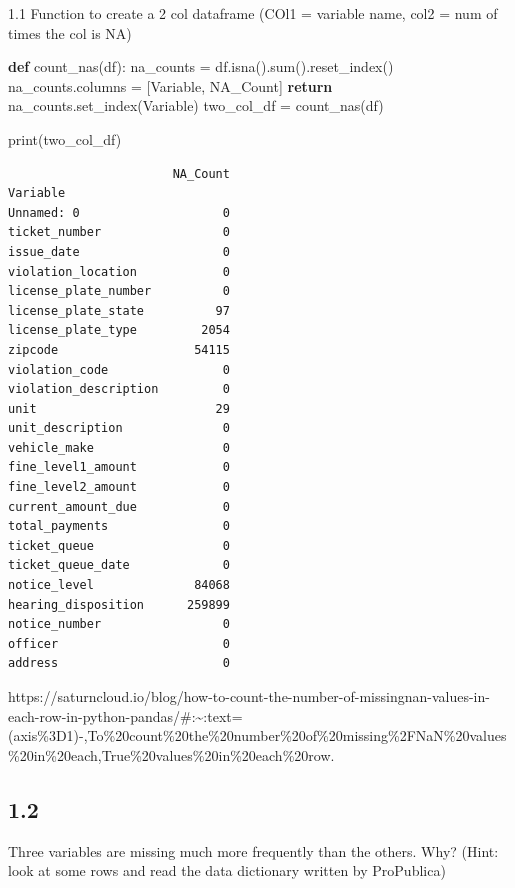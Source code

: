 \documentclass[
  letterpaper,
  DIV=11,
  numbers=noendperiod]{scrartcl}
\newenvironment{Shaded}{\begin{snugshade}}{\end{snugshade}}
\newcommand{\BuiltInTok}[1]{\textcolor[rgb]{0.00,0.23,0.31}{#1}}
\newcommand{\ControlFlowTok}[1]{\textcolor[rgb]{0.00,0.23,0.31}{\textbf{#1}}}
\newcommand{\KeywordTok}[1]{\textcolor[rgb]{0.00,0.23,0.31}{\textbf{#1}}}
\newcommand{\NormalTok}[1]{\textcolor[rgb]{0.00,0.23,0.31}{#1}}
\newcommand{\OperatorTok}[1]{\textcolor[rgb]{0.37,0.37,0.37}{#1}}
\newcommand{\StringTok}[1]{\textcolor[rgb]{0.13,0.47,0.30}{#1}}
\begin{document}
1.1 Function to create a 2 col dataframe (COl1 = variable name, col2 =
num of times the col is NA)

\begin{Shaded}
\begin{Highlighting}[]
\KeywordTok{def}\NormalTok{ count\_nas(df):}
\NormalTok{    na\_counts }\OperatorTok{=}\NormalTok{ df.isna().}\BuiltInTok{sum}\NormalTok{().reset\_index()}
\NormalTok{    na\_counts.columns }\OperatorTok{=}\NormalTok{ [}\StringTok{\textquotesingle{}Variable\textquotesingle{}}\NormalTok{, }\StringTok{\textquotesingle{}NA\_Count\textquotesingle{}}\NormalTok{]}
    \ControlFlowTok{return}\NormalTok{ na\_counts.set\_index(}\StringTok{\textquotesingle{}Variable\textquotesingle{}}\NormalTok{)}
\NormalTok{two\_col\_df }\OperatorTok{=}\NormalTok{ count\_nas(df)}

\BuiltInTok{print}\NormalTok{(two\_col\_df)}
\end{Highlighting}
\end{Shaded}

\begin{verbatim}
                       NA_Count
Variable                       
Unnamed: 0                    0
ticket_number                 0
issue_date                    0
violation_location            0
license_plate_number          0
license_plate_state          97
license_plate_type         2054
zipcode                   54115
violation_code                0
violation_description         0
unit                         29
unit_description              0
vehicle_make                  0
fine_level1_amount            0
fine_level2_amount            0
current_amount_due            0
total_payments                0
ticket_queue                  0
ticket_queue_date             0
notice_level              84068
hearing_disposition      259899
notice_number                 0
officer                       0
address                       0
\end{verbatim}

https://saturncloud.io/blog/how-to-count-the-number-of-missingnan-values-in-each-row-in-python-pandas/\#:\textasciitilde:text=(axis\%3D1)-,To\%20count\%20the\%20number\%20of\%20missing\%2FNaN\%20values\%20in\%20each,True\%20values\%20in\%20each\%20row.

\subsection{1.2}\label{section}

Three variables are missing much more frequently than the others. Why?
(Hint: look at some rows and read the data dictionary written by
ProPublica)
\end{document}
